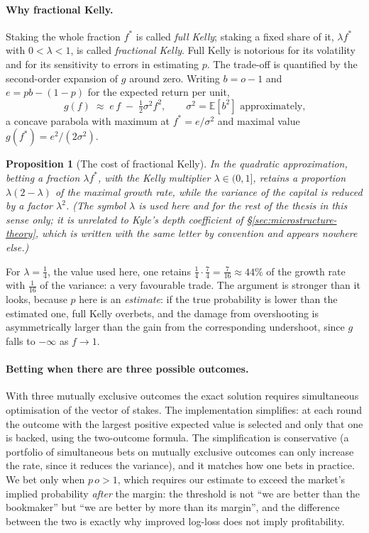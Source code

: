 \documentclass[12pt,a4paper,oneside]{report}
\renewcommand{\_}{\oldunderscore\allowbreak}
\theoremstyle{definition}
\theoremstyle{plain}
\newtheorem{proposition}[theorem]{Proposition}
\theoremstyle{definition}   %
\begin{document}
\paragraph{Why fractional Kelly.} Staking the whole fraction $f^*$ is called \emph{full Kelly};
staking a fixed share of it, $\lambda f^*$ with $0<\lambda<1$, is called \emph{fractional Kelly}.
Full Kelly is notorious for its volatility and for its sensitivity to errors in estimating $p$. The trade-off is quantified by the second-order
expansion of $g$ around zero. Writing $b=o-1$ and $e = pb-(1-p)$ for the expected return per
unit,
\[
g(f) \;\approx\; e\,f \;-\; \tfrac12 \sigma^2 f^2, \qquad \sigma^2 = \mathbb{E}[b^2] \text{ approximately,}
\]
a concave parabola with maximum at $f^{*}=e/\sigma^2$ and maximal value
$g(f^{*}) = e^2/(2\sigma^2)$.

\begin{proposition}[The cost of fractional Kelly]
\label{prop:fractional-kelly}
In the quadratic approximation, betting a fraction $\lambda f^{*}$, with the
\emph{Kelly multiplier} $\lambda \in (0,1]$, retains a proportion $\lambda(2-\lambda)$ of the
maximal growth rate, while the variance of the capital is reduced by a factor $\lambda^2$.
(The symbol $\lambda$ is used here and for the rest of the thesis in this sense only; it is
unrelated to Kyle's depth coefficient of \S\ref{sec:microstructure-theory}, which is written
with the same letter by convention and appears nowhere else.)
\end{proposition}

For $\lambda=\tfrac14$, the value used here, one retains
$\tfrac14\cdot\tfrac74 = \tfrac{7}{16} \approx 44\%$ of the growth rate with $\tfrac{1}{16}$ of
the variance: a very favourable trade. The argument is stronger than it looks, because $p$ here
is an \emph{estimate}: if the true probability is lower than the estimated one, full Kelly
overbets, and the damage from overshooting is asymmetrically larger than the gain from the
corresponding undershoot, since $g$ falls to $-\infty$ as $f\to 1$.

\paragraph{Betting when there are three possible outcomes.} With three mutually exclusive outcomes the exact solution
requires simultaneous optimisation of the vector of stakes. The implementation simplifies: at
each round the outcome with the largest positive expected value is selected and only that one is
backed, using the two-outcome formula. The simplification is conservative (a portfolio of
simultaneous bets on mutually exclusive outcomes can only increase the rate, since it reduces
the variance), and it matches how one bets in practice. We bet only when $p\,o > 1$, which
requires our estimate to exceed the market's implied probability \emph{after} the margin: the
threshold is not ``we are better than the bookmaker'' but ``we are better by more than its
margin'', and the difference between the two is exactly why improved log-loss does not imply
profitability.
\end{document}
